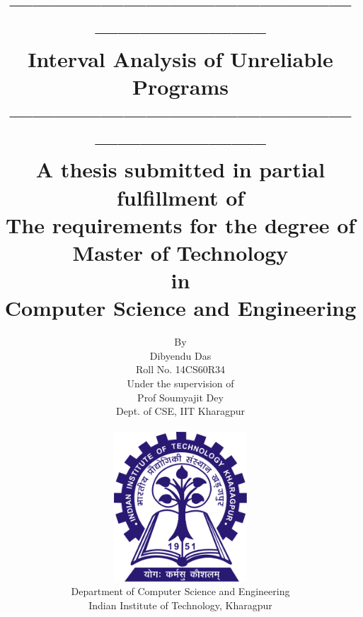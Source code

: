 \documentclass[final,3p, review, times]{Elsevier/elsarticle}
\begin{document}
\title{
{--------------------------------------------------------------------}\\
{Interval Analysis of Unreliable Programs}\\
{--------------------------------------------------------------------}\\
{\large A thesis submitted in partial fulfillment of\\
The requirements for the degree of Master of Technology\\
in\\
Computer Science and Engineering\\}
}
\author{By\\
Dibyendu Das\\
Roll No. 14CS60R34\\
Under the supervision of\\
Prof Soumyajit Dey\\
Dept. of CSE, IIT Kharagpur\\~\\
\includegraphics[width=5cm]{logo.jpg}\\
Department of Computer Science and Engineering\\
Indian Institute of Technology, Kharagpur}
\maketitle
\clearpage

\tableofcontents

\clearpage
{}
\end{document}
